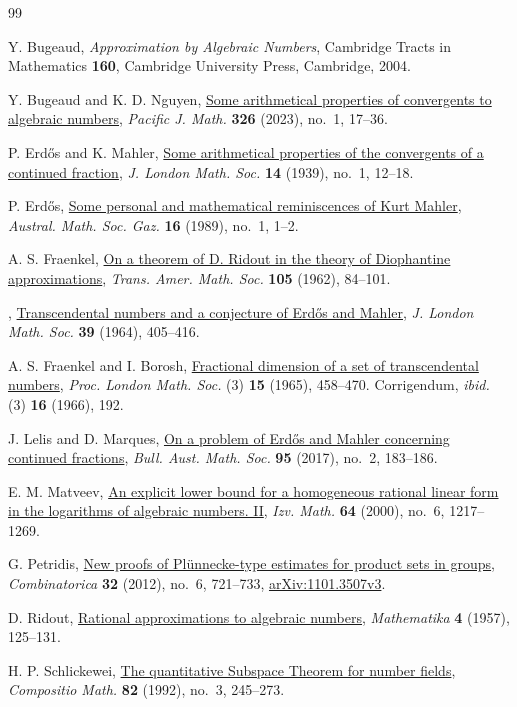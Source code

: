 \documentclass[11pt,reqno]{amsart}
\theoremstyle{definition}
\begin{document}
\begin{thebibliography}{99}

Y. Bugeaud, \emph{Approximation by Algebraic Numbers}, Cambridge
Tracts in Mathematics \textbf{160}, Cambridge University Press,
Cambridge, 2004.

Y. Bugeaud and K. D. Nguyen,
\href{https://doi.org/10.2140/pjm.2023.326.17}{Some arithmetical
properties of convergents to algebraic numbers},
\emph{Pacific J. Math.} \textbf{326} (2023), no.~1, 17--36.

P. Erd\H{o}s and K. Mahler,
\href{https://doi.org/10.1112/jlms/s1-14.1.12}{Some arithmetical
properties of the convergents of a continued fraction},
\emph{J. London Math. Soc.} \textbf{14} (1939), no.~1, 12--18.

P. Erd\H{o}s,
\href{https://old.renyi.hu/~p_erdos/1989-34.pdf}
{Some personal and mathematical reminiscences
of Kurt Mahler},
\emph{Austral. Math. Soc. Gaz.}
\textbf{16} (1989), no.~1, 1--2.

A. S. Fraenkel,
\href{https://doi.org/10.1090/S0002-9947-1962-0144852-2}{On a
theorem of D. Ridout in the theory of Diophantine approximations},
\emph{Trans. Amer. Math. Soc.} \textbf{105} (1962), 84--101.

\bysame,
\href{https://doi.org/10.1112/jlms/s1-39.1.405}{Transcendental
numbers and a conjecture of Erd\H{o}s and Mahler},
\emph{J. London Math. Soc.} \textbf{39} (1964), 405--416.

A. S. Fraenkel and I. Borosh,
\href{https://doi.org/10.1112/plms/s3-15.1.458}{Fractional dimension
of a set of transcendental numbers}, \emph{Proc. London Math. Soc.}
(3) \textbf{15} (1965), 458--470. Corrigendum, \emph{ibid.}
(3) \textbf{16} (1966), 192.

J. Lelis and D. Marques,
\href{https://doi.org/10.1017/S0004972716000770}
{On a problem of Erd\H{o}s and Mahler concerning
continued fractions},
\emph{Bull. Aust. Math. Soc.}
\textbf{95} (2017), no.~2, 183--186.

E. M. Matveev,
\href{https://doi.org/10.1070/IM2000v064n06ABEH000314}{An explicit
lower bound for a homogeneous rational linear form in the logarithms
of algebraic numbers. II}, \emph{Izv. Math.} \textbf{64} (2000),
no.~6, 1217--1269.

G. Petridis,
\href{https://doi.org/10.1007/s00493-012-2818-5}{New proofs of
Pl\"unnecke-type estimates for product sets in groups},
\emph{Combinatorica} \textbf{32} (2012), no.~6, 721--733,
\href{https://arxiv.org/abs/1101.3507v3}{arXiv:1101.3507v3}.

D. Ridout,
\href{https://doi.org/10.1112/S0025579300001182}{Rational
approximations to algebraic numbers},
\emph{Mathematika} \textbf{4} (1957), 125--131.

H. P. Schlickewei,
\href{https://www.numdam.org/item/CM_1992__82_3_245_0/}{The
quantitative Subspace Theorem for number fields},
\emph{Compositio Math.} \textbf{82} (1992), no.~3, 245--273.

\end{thebibliography}
\end{document}
